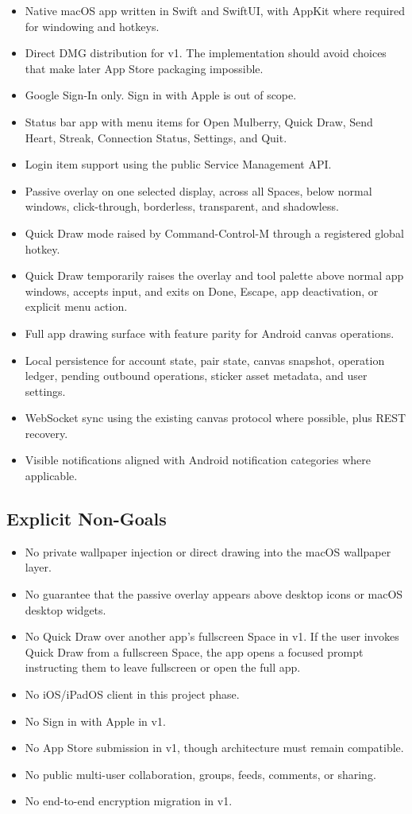 \documentclass[11pt]{article}
\begin{document}
\begin{itemize}
  \item Native macOS app written in Swift and SwiftUI, with AppKit where required for windowing and hotkeys.
  \item Direct DMG distribution for v1. The implementation should avoid choices that make later App Store packaging impossible.
  \item Google Sign-In only. Sign in with Apple is out of scope.
  \item Status bar app with menu items for Open Mulberry, Quick Draw, Send Heart, Streak, Connection Status, Settings, and Quit.
  \item Login item support using the public Service Management API.
  \item Passive overlay on one selected display, across all Spaces, below normal windows, click-through, borderless, transparent, and shadowless.
  \item Quick Draw mode raised by Command-Control-M through a registered global hotkey.
  \item Quick Draw temporarily raises the overlay and tool palette above normal app windows, accepts input, and exits on Done, Escape, app deactivation, or explicit menu action.
  \item Full app drawing surface with feature parity for Android canvas operations.
  \item Local persistence for account state, pair state, canvas snapshot, operation ledger, pending outbound operations, sticker asset metadata, and user settings.
  \item WebSocket sync using the existing canvas protocol where possible, plus REST recovery.
  \item Visible notifications aligned with Android notification categories where applicable.
\end{itemize}

\subsection{Explicit Non-Goals}

\begin{itemize}
  \item No private wallpaper injection or direct drawing into the macOS wallpaper layer.
  \item No guarantee that the passive overlay appears above desktop icons or macOS desktop widgets.
  \item No Quick Draw over another app's fullscreen Space in v1. If the user invokes Quick Draw from a fullscreen Space, the app opens a focused prompt instructing them to leave fullscreen or open the full app.
  \item No iOS/iPadOS client in this project phase.
  \item No Sign in with Apple in v1.
  \item No App Store submission in v1, though architecture must remain compatible.
  \item No public multi-user collaboration, groups, feeds, comments, or sharing.
  \item No end-to-end encryption migration in v1.
\end{itemize}
\end{document}
